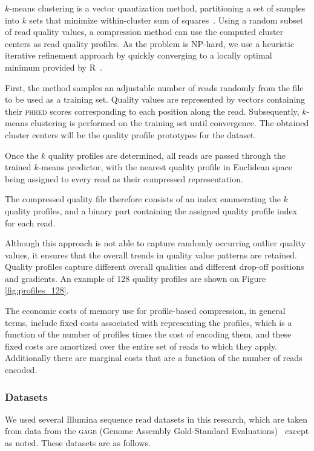 $k$-means clustering is a vector quantization method, partitioning a
set of samples into $k$ sets that minimize within-cluster sum of
squares~\cite{macqueen1967some}. Using a random subset of read
quality values, a compression method can use the computed cluster
centers as read quality profiles. As the problem is NP-hard, we use a
heuristic iterative refinement approach by quickly converging to a
locally optimal minimum provided by R~\cite{hartigan1979algorithm}.

First, the method samples an adjustable number of reads
randomly from the file to be used as a training set. Quality values
are represented by vectors containing their \textsc{phred} scores
corresponding to each position along the read. Subsequently, $k$-means
clustering is performed on the training set until convergence. The
obtained cluster centers will be the quality profile prototypes for
the dataset.

Once the $k$ quality profiles are determined, all reads
are passed through the trained $k$-means predictor, with the nearest
quality profile in Euclidean space being assigned to every read
as their compressed representation.

The compressed quality file therefore consists of an index enumerating
the $k$ quality profiles, and a binary part containing the assigned
quality profile index for each read.

Although this approach is not able to capture randomly occurring
outlier quality values, it ensures that the overall trends in quality
value patterns are retained. Quality profiles capture different overall
qualities and different drop-off positions and gradients. An example
of 128 quality profiles are shown on Figure \ref{fig:profiles_128}.

The economic costs of memory use for profile-based compression, in
general terms, include fixed costs associated with representing the
profiles, which is a function of the number of profiles times the cost
of encoding them, and these fixed costs are amortized over the entire
set of reads to which they apply. Additionally there are marginal
costs that are a function of the number of reads encoded.

\subsubsection{Datasets}

We used several Illumina sequence read datasets in this research,
which are taken from data from the \textsc{gage} (Genome Assembly
Gold-Standard Evaluations)~\cite{Salzberg:2012rc} except as
noted. These datasets are as follows.

